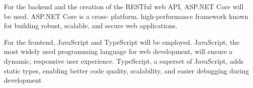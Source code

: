 \documentclass[conference]{IEEEtran}
\begin{document}
For the backend and the creation of the RESTful web
API, ASP.NET Core will be used. ASP.NET Core is a cross-
platform, high-performance framework known for building
robust, scalable, and secure web applications. 
\newline

For the frontend, JavaScript and TypeScript will be
employed. JavaScript, the most widely used programming
language for web development, will ensure a dynamic,
responsive user experience. TypeScript, a superset of
JavaScript, adds static types, enabling better code quality,
scalability, and easier debugging during development
\end{document}
